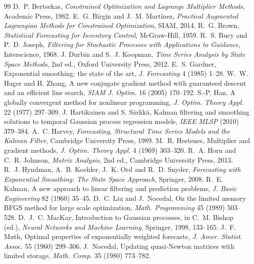 \begin{thebibliography}{99}
 D.~P. Bertsekas, \emph{Constrained Optimization and Lagrange Multiplier Methods},
Academic Press, 1982.
 E.~G. Birgin and J.~M. Mart\'inez, \emph{Practical Augmented Lagrangian Methods
for Constrained Optimization}, SIAM, 2014.
 R.~G. Brown, \emph{Statistical Forecasting for Inventory Control}, McGraw-Hill, 1959.
 R.~S. Bucy and P.~D. Joseph, \emph{Filtering for Stochastic Processes with Applications to Guidance},
  Interscience, 1968.
 J. Durbin and S.~J. Koopman, \emph{Time Series Analysis by State Space Methods}, 2nd ed.,
  Oxford University Press, 2012.
 E.~S. Gardner, Exponential smoothing: the state of the art,
  \emph{J. Forecasting} 4 (1985) 1--28.
 W.~W. Hager and H. Zhang, A new conjugate gradient method with guaranteed
descent and an efficient line search, \emph{SIAM J. Optim.} 16 (2005) 170--192.
 S.-P. Han, A globally convergent method for nonlinear programming,
\emph{J. Optim. Theory Appl.} 22 (1977) 297--309.
 J. Hartikainen and S. S\"arkk\"a, Kalman filtering and smoothing solutions to temporal
  Gaussian process regression models, \emph{IEEE MLSP} (2010) 379--384.
 A.~C. Harvey, \emph{Forecasting, Structural Time Series Models and the Kalman Filter},
  Cambridge University Press, 1989.
 M.~R. Hestenes, Multiplier and gradient methods,
\emph{J. Optim. Theory Appl.} 4 (1969) 303--320.
 R.~A. Horn and C.~R. Johnson, \emph{Matrix Analysis}, 2nd ed., Cambridge University Press, 2013.
 R.~J. Hyndman, A.~B. Koehler, J.~K. Ord and R.~D. Snyder,
  \emph{Forecasting with Exponential Smoothing: The State Space Approach}, Springer, 2008.
 R.~E. Kalman, A new approach to linear filtering and prediction problems,
  \emph{J. Basic Engineering} 82 (1960) 35--45.
 D.~C. Liu and J.~Nocedal, On the limited memory BFGS method for large scale
optimization, \emph{Math. Programming} 45 (1989) 503--528.
 D.~J.~C. MacKay, Introduction to Gaussian processes, in C.~M. Bishop (ed.),
  \emph{Neural Networks and Machine Learning}, Springer, 1998, 133--165.
 J.~F. Muth, Optimal properties of exponentially weighted forecasts,
  \emph{J. Amer. Statist. Assoc.} 55 (1960) 299--306.
 J.~Nocedal, Updating quasi-Newton matrices with limited storage,
\emph{Math. Comp.} 35 (1980) 773--782.

\end{thebibliography}
